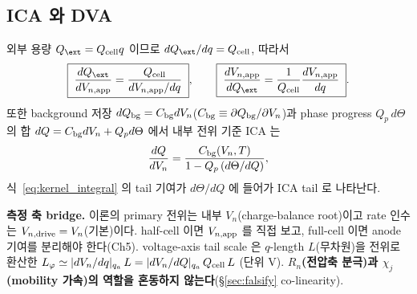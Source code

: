 \subsection{ICA 와 DVA}
외부 용량 $Q_\ext=Q_\cell q$ 이므로 $dQ_\ext/dq=Q_\cell$, 따라서
\begin{equation}
\boxed{\;\frac{dQ_\ext}{dV_{n,\app}}=\frac{Q_\cell}{dV_{n,\app}/dq}\;},\qquad
\boxed{\;\frac{dV_{n,\app}}{dQ_\ext}=\frac{1}{Q_\cell}\frac{dV_{n,\app}}{dq}\;}.
\label{eq:icadva}
\end{equation}
또한 background 저장 $dQ_{\mathrm{bg}}=C_{\mathrm{bg}} dV_n$($C_{\mathrm{bg}}\equiv\partial Q_{\mathrm{bg}}/\partial V_n$)과 phase progress
$Q_p\,d\Theta$ 의 합 $dQ=C_{\mathrm{bg}} dV_n+Q_p d\Theta$ 에서 내부 전위 기준 ICA 는
\begin{equation}
\frac{dQ}{dV_n}=\frac{C_{\mathrm{bg}}(V_n,T)}{1-Q_p\,(d\Theta/dQ)},
\label{eq:ica_internal}
\end{equation}
식~\eqref{eq:kernel_integral} 의 tail 기여가 $d\Theta/dQ$ 에 들어가 ICA tail 로 나타난다.

\textbf{측정 축 bridge.} 이론의 primary 전위는 내부 $V_n$(charge-balance root)이고 rate 인수는
$V_{n,\mathrm{drive}}=V_n$(기본)이다. half-cell 이면 $V_{n,\mathrm{app}}$ 를 직접 보고, full-cell 이면 anode 기여를 분리해야
한다(Ch5). voltage-axis tail scale 은 $q$-length $L$(무차원)을 전위로 환산한
$L_\varphi\simeq|dV_n/dq|_{q_a}\,L=|dV_n/dQ|_{q_a}\,Q_{\mathrm{cell}}\,L$ (단위 V). \textbf{$R_n$(전압축 분극)과
$\chi_j$(mobility 가속)의 역할을 혼동하지 않는다}(\S\ref{sec:falsify} co-linearity).

